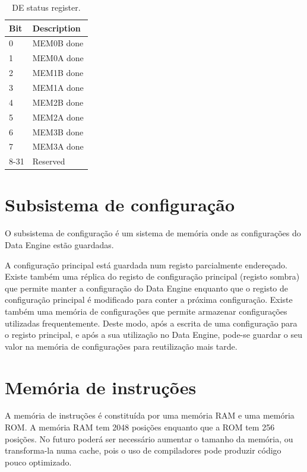 \begin{table}[!htbp]
  \centering
  \caption{DE status register.}
    \begin{tabular}{|p{1.5cm}|p{7cm}|}
    \hline 
    {\bf Bit} & {\bf Description} \\
    \hline \hline 
     0 & MEM0B done \\
    \hline
     1 & MEM0A done\\
    \hline
     2 & MEM1B done \\
    \hline
     3 & MEM1A done \\
    \hline
     4 & MEM2B done \\
    \hline
     5 & MEM2A done  \\
    \hline
     6 & MEM3B done \\
    \hline
     7 & MEM3A done \\
    \hline
     8-31 & Reserved \\
    \hline

    \end{tabular}
  \label{tab:de_stat_reg}
\end{table}


\section{Subsistema de configuração}
\label{section:Subsistema de configuracao}

O subsistema de configuração é um sistema de memória onde as configurações do Data Engine estão guardadas. 

A configuração principal está guardada num registo parcialmente endereçado. Existe também uma réplica do registo de configuração principal (registo sombra) que permite manter a configuração do Data Engine enquanto que o registo de configuração principal é modificado para conter a próxima configuração. 
Existe também uma memória de configurações que permite armazenar configurações utilizadas frequentemente. Deste modo, após a escrita de uma configuração para o registo principal, e após a sua utilização no Data Engine, pode-se guardar o seu valor na memória de configurações para reutilização mais tarde.




\section{Memória de instruções}
\label{section:Memoria de instrucoes}

A memória de instruções é constituída por uma memória RAM e uma memória ROM. A memória RAM tem 2048 posições enquanto que a ROM tem 256 posições. No futuro poderá ser necessário aumentar o tamanho da memória, ou transforma-la numa cache, pois o uso de compiladores pode produzir código pouco optimizado.

